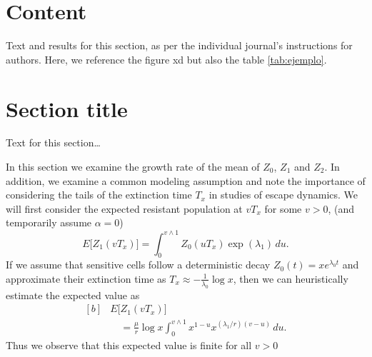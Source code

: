 \documentclass{bmcart}
\begin{document}
	
	\section*{Content}
		Text and results for this section, as per the individual journal's instructions for authors. Here, we reference the figure xd but also the table \ref{tab:ejemplo}.
	
	\section*{Section title}
		Text for this section\ldots

		In this section we examine the growth rate of the mean of $Z_0$, $Z_1$ and $Z_2$. In
		addition, we examine a common modeling assumption and note the
		importance of considering the tails of the extinction time $T_x$ in
		studies of escape dynamics.
		We will first consider the expected resistant population at $vT_x$ for
		some $v>0$, (and temporarily assume $\alpha=0$)
		\[
		E \bigl[Z_1(vT_x) \bigr]=
		\int_0^{v\wedge
			1}Z_0(uT_x)
		\exp (\lambda_1)\,du .
		\]
		If we assume that sensitive cells follow a deterministic decay
		$Z_0(t)=xe^{\lambda_0 t}$ and approximate their extinction time as
		$T_x\approx-\frac{1}{\lambda_0}\log x$, then we can heuristically
		estimate the expected value as
		\begin{equation}\label{eqexpmuts}
			\begin{aligned}[b]
				&      E\bigl[Z_1(vT_x)\bigr]\\
				&\quad      = \frac{\mu}{r}\log x
				\int_0^{v\wedge1}x^{1-u}x^{({\lambda_1}/{r})(v-u)}\,du .
			\end{aligned}
		\end{equation}
		Thus we observe that this expected value is finite for all $v>0$
		
\end{document}
